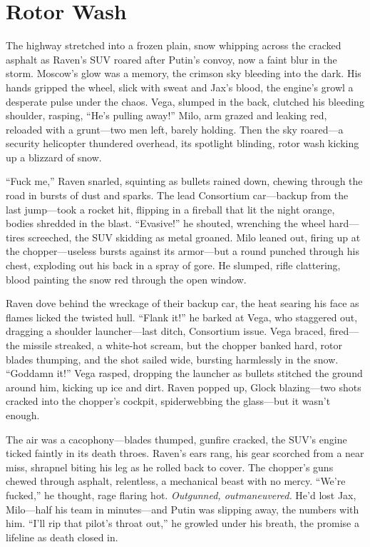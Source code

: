 \documentclass[12pt]{book}
\begin{document}
\section{Rotor Wash}

The highway stretched into a frozen plain, snow whipping across the cracked asphalt as Raven’s SUV roared after Putin’s convoy, now a faint blur in the storm. Moscow’s glow was a memory, the crimson sky bleeding into the dark. His hands gripped the wheel, slick with sweat and Jax’s blood, the engine’s growl a desperate pulse under the chaos. Vega, slumped in the back, clutched his bleeding shoulder, rasping, “He’s pulling away!” Milo, arm grazed and leaking red, reloaded with a grunt—two men left, barely holding. Then the sky roared—a security helicopter thundered overhead, its spotlight blinding, rotor wash kicking up a blizzard of snow.

“Fuck me,” Raven snarled, squinting as bullets rained down, chewing through the road in bursts of dust and sparks. The lead Consortium car—backup from the last jump—took a rocket hit, flipping in a fireball that lit the night orange, bodies shredded in the blast. “Evasive!” he shouted, wrenching the wheel hard—tires screeched, the SUV skidding as metal groaned. Milo leaned out, firing up at the chopper—useless bursts against its armor—but a round punched through his chest, exploding out his back in a spray of gore. He slumped, rifle clattering, blood painting the snow red through the open window.

Raven dove behind the wreckage of their backup car, the heat searing his face as flames licked the twisted hull. “Flank it!” he barked at Vega, who staggered out, dragging a shoulder launcher—last ditch, Consortium issue. Vega braced, fired—the missile streaked, a white-hot scream, but the chopper banked hard, rotor blades thumping, and the shot sailed wide, bursting harmlessly in the snow. “Goddamn it!” Vega rasped, dropping the launcher as bullets stitched the ground around him, kicking up ice and dirt. Raven popped up, Glock blazing—two shots cracked into the chopper’s cockpit, spiderwebbing the glass—but it wasn’t enough.

The air was a cacophony—blades thumped, gunfire cracked, the SUV’s engine ticked faintly in its death throes. Raven’s ears rang, his gear scorched from a near miss, shrapnel biting his leg as he rolled back to cover. The chopper’s guns chewed through asphalt, relentless, a mechanical beast with no mercy. “We’re fucked,” he thought, rage flaring hot. \textit{Outgunned, outmaneuvered.} He’d lost Jax, Milo—half his team in minutes—and Putin was slipping away, the numbers with him. “I’ll rip that pilot’s throat out,” he growled under his breath, the promise a lifeline as death closed in.
\end{document}
